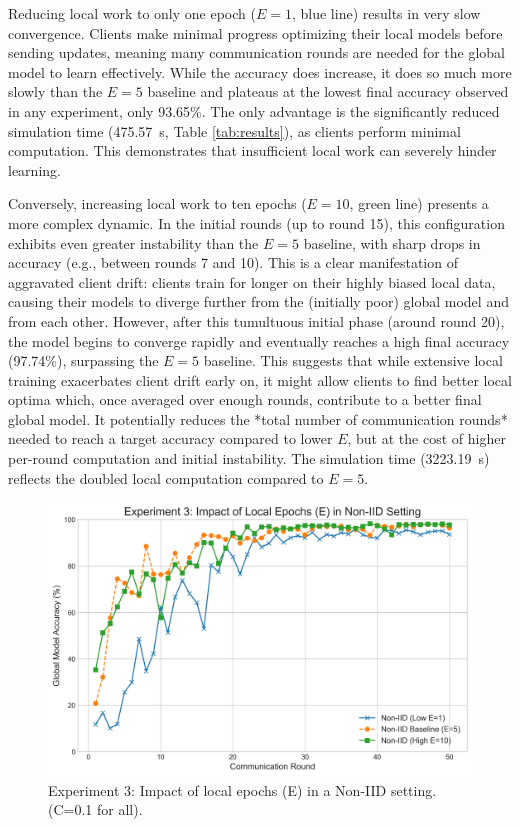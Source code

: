 \documentclass[conference]{IEEEtran}
\begin{document}
Reducing local work to only one epoch ($E=1$, blue line) results in very slow convergence. Clients make minimal progress optimizing their local models before sending updates, meaning many communication rounds are needed for the global model to learn effectively. While the accuracy does increase, it does so much more slowly than the $E=5$ baseline and plateaus at the lowest final accuracy observed in any experiment, only 93.65\%. The only advantage is the significantly reduced simulation time (\SI{475.57}{s}, Table \ref{tab:results}), as clients perform minimal computation. This demonstrates that insufficient local work can severely hinder learning.

Conversely, increasing local work to ten epochs ($E=10$, green line) presents a more complex dynamic. In the initial rounds (up to round 15), this configuration exhibits even greater instability than the $E=5$ baseline, with sharp drops in accuracy (e.g., between rounds 7 and 10). This is a clear manifestation of aggravated client drift: clients train for longer on their highly biased local data, causing their models to diverge further from the (initially poor) global model and from each other. However, after this tumultuous initial phase (around round 20), the model begins to converge rapidly and eventually reaches a high final accuracy (97.74\%), surpassing the $E=5$ baseline. This suggests that while extensive local training exacerbates client drift early on, it might allow clients to find better local optima which, once averaged over enough rounds, contribute to a better final global model. It potentially reduces the *total number of communication rounds* needed to reach a target accuracy compared to lower $E$, but at the cost of higher per-round computation and initial instability. The simulation time (\SI{3223.19}{s}) reflects the doubled local computation compared to $E=5$.

\begin{figure}[htbp]
  \centering
  \includegraphics[width=0.9\linewidth]{fig_3_impact_of_E} %
  \caption{Experiment 3: Impact of local epochs (E) in a Non-IID setting. (C=0.1 for all).}
  \label{fig:impact_e}
\end{figure}
\end{document}

